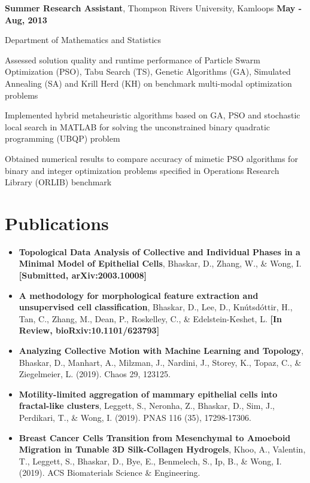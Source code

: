 \documentclass[margin,line]{res}
\newenvironment{list1}{
  \begin{list}{\ding{113}}{
      \setlength{\itemsep}{0in}
      \setlength{\parsep}{0in} \setlength{\parskip}{0in}
      \setlength{\topsep}{0in} \setlength{\partopsep}{0in}
      \setlength{\leftmargin}{0.17in}}}{\end{list}}
\newenvironment{list3}{
  \begin{list}{\textopenbullet}{
      \setlength{\itemsep}{0in}
      \setlength{\parsep}{0in} \setlength{\parskip}{0in}
      \setlength{\topsep}{0in} \setlength{\partopsep}{0in}
      \setlength{\leftmargin}{0.1in}}}{\end{list}}
\begin{document}
\begin{resume}
{\bf Summer Research Assistant}, Thompson Rivers University, Kamloops \hfill {\bf May - Aug, 2013}\\
\vspace*{-.2cm}
\begin{list1}
\item[] Department of Mathematics and Statistics
\vspace*{.2cm}
\begin{list3}
\setlength\itemsep{0.5em}
\item Assessed solution quality and runtime performance of Particle Swarm Optimization (PSO), Tabu Search (TS), Genetic Algorithms (GA), Simulated Annealing (SA) and Krill Herd (KH) on benchmark multi-modal optimization problems
\item Implemented hybrid metaheuristic algorithms based on GA, PSO and stochastic local search in MATLAB for solving the unconstrained binary quadratic programming (UBQP) problem
\item Obtained numerical results to compare accuracy of mimetic PSO algorithms for binary and integer optimization problems specified in Operations Research Library (ORLIB) benchmark
\end{list3}
\end{list1}

\vspace*{.3cm}

\section{\sc Publications}

{\renewcommand\leftmargini{0em}
\begin{itemize}
\item{\bf Topological Data Analysis of Collective and Individual Phases in a Minimal Model of Epithelial Cells}, Bhaskar, D., Zhang, W., \& Wong, I. {\bf[Submitted, arXiv:2003.10008]}
\item{\bf A methodology for morphological feature extraction and unsupervised cell classification}, Bhaskar, D., Lee, D., Kn\'{u}tsd\'{o}ttir, H., Tan, C., Zhang, M., Dean, P., Roskelley, C., \& Edelstein-Keshet, L. {\bf[In Review, bioRxiv:10.1101/623793]}
\vspace*{.1cm}
\item{\bf Analyzing Collective Motion with Machine Learning and Topology}, Bhaskar, D., Manhart, A., Milzman, J., Nardini, J., Storey, K., Topaz, C., \& Ziegelmeier, L. (2019). Chaos 29, 123125.
\vspace*{.1cm}
\item{\bf Motility-limited aggregation of mammary epithelial cells into fractal-like clusters}, Leggett, S., Neronha, Z., Bhaskar, D., Sim, J., Perdikari, T., \& Wong, I. (2019). PNAS 116 (35), 17298-17306.
\item{\bf Breast Cancer Cells Transition from Mesenchymal to Amoeboid Migration in Tunable 3D Silk-Collagen Hydrogels}, Khoo, A., Valentin, T., Leggett, S., Bhaskar, D., Bye, E., Benmelech, S., Ip, B., \& Wong, I. (2019). ACS Biomaterials Science \& Engineering.
\end{itemize}
}


\end{resume}
\end{document}
